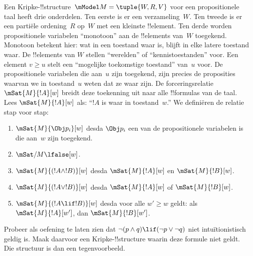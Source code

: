 \documentclass[../../../include/open-logic-section]{subfiles}
\begin{document}
Een Kripke-!!{structure}~$\mModel M = \tuple{W, R, V}$ voor een propositionele
taal heeft drie onderdelen. Ten eerste is er een verzameling~$W$. Ten tweede is
er een partiële ordening~$R$ op~$W$ met een kleinste !!{element}. Ten derde
worden propositionele variabelen ``monotoon'' aan de !!{element}s van~$W$
toegekend. Monotoon betekent hier: wat in een toestand waar is, blijft in elke
latere toestand waar. De !!{element}s van $W$ stellen ``werelden'' of
``kennistoestanden'' voor. Een element $v \geq u$ stelt een ``mogelijke
toekomstige toestand'' van~$u$ voor. De propositionele variabelen die aan~$u$
zijn toegekend, zijn precies de proposities waarvan we in toestand~$u$ weten dat
ze waar zijn. De forceringsrelatie $\mSat{M}{!A}[w]$ breidt deze toekenning uit
naar alle !!{formula}s van de taal. Lees $\mSat{M}{!A}[w]$ als: ``$!A$ is waar
in toestand~$w$.'' We definiëren de relatie stap voor stap:
\begin{enumerate}
\item $\mSat{M}{\Obj p_i}[w]$ desda $\Obj p_i$ een van de propositionele
  variabelen is die aan~$w$ zijn toegekend.
\item $\mSat/{M}{\lfalse}[w]$.
\item $\mSat{M}{(!A \land !B)}[w]$ desda $\mSat{M}{!A}[w]$ en $\mSat{M}{!B}[w]$.
\item $\mSat{M}{(!A \lor !B)}[w]$ desda $\mSat{M}{!A}[w]$ of $\mSat{M}{!B}[w]$.
\item $\mSat{M}{(!A \lif !B)}[w]$ desda voor alle $w' \geq w$ geldt: als
  $\mSat{M}{!A}[w']$, dan $\mSat{M}{!B}[w']$.
\end{enumerate}
Probeer als oefening te laten zien dat $\lnot (p \land q) \lif
(\lnot p \lor \lnot q)$ niet intuïtionistisch geldig is. Maak daarvoor een
Kripke-!!{structure} waarin deze formule niet geldt. Die structuur is dan een
tegenvoorbeeld.
\end{document}
